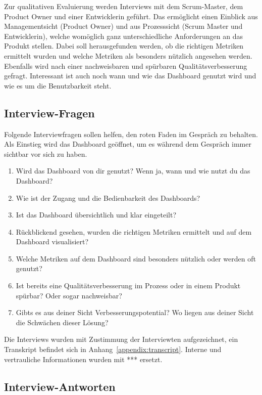 Zur qualitativen Evaluierung werden Interviews mit dem Scrum-Master, dem Product Owner und einer Entwicklerin geführt.
Das ermöglicht einen Einblick aus Managementsicht (Product Owner) und aus Prozesssicht (Scrum Master und Entwicklerin), welche womöglich ganz unterschiedliche Anforderungen an das Produkt stellen.
Dabei soll herausgefunden werden, ob die richtigen Metriken ermittelt wurden und welche Metriken als besonders nützlich angesehen werden.
Ebenfalls wird nach einer nachweisbaren und spürbaren Qualitätsverbesserung gefragt.
Interessant ist auch noch wann und wie das Dashboard genutzt wird und wie es um die Benutzbarkeit steht.

\subsection{Interview-Fragen}

Folgende Interviewfragen sollen helfen, den roten Faden im Gespräch zu behalten.
Als Einstieg wird das Dashboard geöffnet, um es während dem Gespräch immer sichtbar vor sich zu haben.

\begin{enumerate}
    \item Wird das Dashboard von dir genutzt? Wenn ja, wann und wie nutzt du das Dashboard?
    \item Wie ist der Zugang und die Bedienbarkeit des Dashboards?
    \item Ist das Dashboard übersichtlich und klar eingeteilt?
    \item Rückblickend gesehen, wurden die richtigen Metriken ermittelt und auf dem Dashboard visualisiert?
    \item Welche Metriken auf dem Dashboard sind besonders nützlich oder werden oft genutzt?
    \item Ist bereits eine Qualitätsverbesserung im Prozess oder in einem Produkt spürbar? Oder sogar nachweisbar?
    \item Gibts es aus deiner Sicht Verbesserungspotential? Wo liegen aus deiner Sicht die Schwächen dieser Lösung?
\end{enumerate}

Die Interviews wurden mit Zustimmung der Interviewten aufgezeichnet, ein Transkript befindet sich in Anhang~\ref{appendix:transcript}.
Interne und vertrauliche Informationen wurden mit *** ersetzt.

\clearpage
\subsection{Interview-Antworten}

